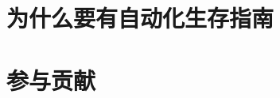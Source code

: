 \frontmatter

\chapter{为什么要有自动化生存指南}

\chapter{参与贡献}

\clearpage
{
  \hypersetup{hidelinks}
  \tableofcontents
}

\mainmatter
